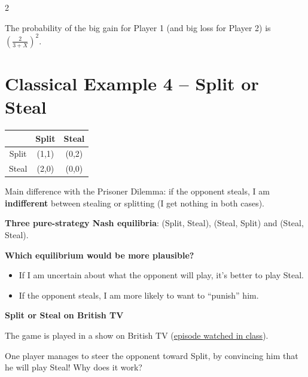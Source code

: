 \documentclass[a4paper,9pt]{extarticle}
\begin{document}
\begin{multicols}{2}
\begin{important}
The probability of the big gain for Player 1 (and big loss for Player 2) is
$\left(\frac{2}{3+X}\right)^2$.

\end{important}



\section{Classical Example 4 -- Split or Steal}


\begin{center}
\begin{tabular}{c|cc}
 & Split & Steal \\
\hline
Split & (1,1) & (0,2) \\
Steal & (2,0) & (0,0) \\
\end{tabular}
\end{center}


\begin{important}

Main difference with the Prisoner Dilemma: if the opponent steals, I am
\textbf{indifferent} between stealing or splitting (I get nothing in both cases).

\textbf{Three pure-strategy Nash equilibria}: (Split, Steal), (Steal, Split) and
(Steal, Steal).

\end{important}


\textbf{Which equilibrium would be more plausible?}

\begin{itemize}

\item If I am uncertain about what the opponent will play, it's better to play Steal.

\item If the opponent steals, I am more likely to want to ``punish'' him.

\end{itemize}


\begin{example}

\textbf{Split or Steal on British TV}

The game is played in a show on British TV
(\href{https://www.youtube.com/watch?v=S0qjK3TWZE8}{episode watched in class}).

One player manages to steer the opponent toward Split, by convincing him that he will play
Steal! Why does it work?


\end{example}
\end{multicols}
\end{document}
